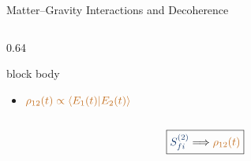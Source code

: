 \documentclass[aspectratio=169]{beamer}
\begin{document}
\begin{frame}[c]{Matter--Gravity Interactions and Decoherence}
\begin{columns}[c,totalwidth=1.03\textwidth]
\begin{column}{0.64\textwidth}
\begin{beamercolorbox}[rounded=true,sep=4pt,center,wd=\linewidth]{block body}
\vspace{0.4cm}

\begin{itemize}
\item ${\color{matter}{\rho_{12}(t)}
\propto
\langle E_1(t)|E_2(t)\rangle}$
\end{itemize}

\end{beamercolorbox}

\end{column}

\end{columns}

\vspace{0.6cm}

\begin{center}
{\huge
\[\boxed{
{\color{graviton}
S_{fi}^{(2)}}
\Longrightarrow
{\color{matter}
\rho_{12}(t)}
}\]
}
\end{center}

\end{frame}
%
\end{document}
